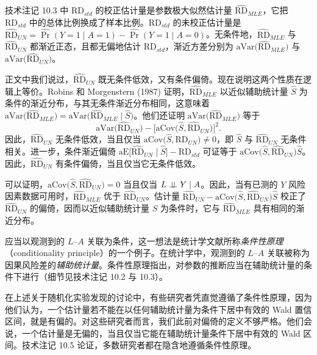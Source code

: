 \begin{techpoint}[校正估计量与未校正估计量的比较]
技术注记 10.3 中 $\mathrm{RD}_{std}$ 的校正估计量是参数极大似然估计量 $\widehat{\mathrm{RD}}_{MLE}$，它把 $\mathrm{RD}_{std}$ 中的总体比例换成了样本比例。$\mathrm{RD}_{std}$ 的未校正估计量是 $\widehat{\mathrm{RD}}_{UN}=\widehat{\Pr}(Y=1\mid A=1)-\widehat{\Pr}(Y=1\mid A=0)$。无条件地，$\widehat{\mathrm{RD}}_{MLE}$ 与 $\widehat{\mathrm{RD}}_{UN}$ 都渐近正态，且都无偏地估计 $\mathrm{RD}_{std}$，渐近方差分别为 $\mathrm{aVar}\bigl(\widehat{\mathrm{RD}}_{MLE}\bigr)$ 与 $\mathrm{aVar}\bigl(\widehat{\mathrm{RD}}_{UN}\bigr)$。

正文中我们说过，$\widehat{\mathrm{RD}}_{UN}$ 既无条件低效，又有条件偏倚。现在说明这两个性质在逻辑上等价。Robins 和 Morgenstern (1987) 证明，$\widehat{\mathrm{RD}}_{MLE}$ 以近似辅助统计量 $\hat S$ 为条件的渐近分布，与其无条件渐近分布相同，这意味着 $\mathrm{aVar}\bigl(\widehat{\mathrm{RD}}_{MLE}\bigr)=\mathrm{aVar}\bigl(\widehat{\mathrm{RD}}_{MLE}\mid\hat S\bigr)$。他们还证明 $\mathrm{aVar}\bigl(\widehat{\mathrm{RD}}_{MLE}\bigr)$ 等于
\[
\mathrm{aVar}\bigl(\widehat{\mathrm{RD}}_{UN}\bigr)-\bigl[\mathrm{aCov}\bigl(\hat S,\widehat{\mathrm{RD}}_{UN}\bigr)\bigr]^2 .
\]
因此，$\widehat{\mathrm{RD}}_{UN}$ 无条件低效，当且仅当 $\mathrm{aCov}\bigl(\hat S,\widehat{\mathrm{RD}}_{UN}\bigr)\neq 0$，即 $\hat S$ 与 $\widehat{\mathrm{RD}}_{UN}$ 无条件相关。进一步，条件渐近偏倚 $\mathrm{aE}\bigl[\widehat{\mathrm{RD}}_{UN}\mid\hat S\bigr]-\mathrm{RD}_{std}$ 可证等于 $\mathrm{aCov}\bigl(\hat S,\widehat{\mathrm{RD}}_{UN}\bigr)\hat S$。因此，$\widehat{\mathrm{RD}}_{UN}$ 有条件偏倚，当且仅当它无条件低效。

可以证明，$\mathrm{aCov}\bigl(\hat S,\widehat{\mathrm{RD}}_{UN}\bigr)=0$ 当且仅当 $L\perp\!\!\!\perp Y\mid A$。因此，当有已测的 $Y$ 风险因素数据可用时，$\widehat{\mathrm{RD}}_{MLE}$ 优于 $\widehat{\mathrm{RD}}_{UN}$。估计量 $\widehat{\mathrm{RD}}_{UN}-\mathrm{aCov}\bigl(\hat S,\widehat{\mathrm{RD}}_{UN}\bigr)\hat S$ 校正了 $\widehat{\mathrm{RD}}_{UN}$ 的偏倚，因而以近似辅助统计量 $\hat S$ 为条件时，它与 $\widehat{\mathrm{RD}}_{MLE}$ 具有相同的渐近分布。
\end{techpoint}

应当以观测到的 $L$–$A$ 关联为条件，这一想法是统计学文献所称\emph{条件性原理}（conditionality principle）的一个例子。在统计学中，观测到的 $L$–$A$ 关联被称为因果风险差的\emph{辅助统计量}。条件性原理指出，对参数的推断应当在辅助统计量的条件下进行（细节见技术注记 10.2 与 10.3）。

在上述关于随机化实验发现的讨论中，有些研究者凭直觉遵循了条件性原理，因为他们认为，一个估计量若不能在以任何辅助统计量为条件下居中有效的 Wald 置信区间，就是有偏的。对这些研究者而言，我们此前对偏倚的定义不够严格。他们会说，一个估计量是无偏的，当且仅当它能在辅助统计量条件下居中有效的 Wald 区间。技术注记 10.5 论证，多数研究者都在隐含地遵循条件性原理。

